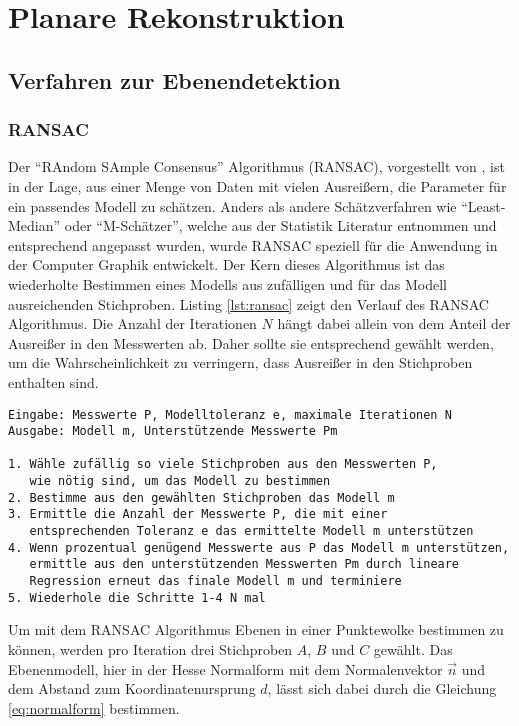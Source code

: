 \section{Planare Rekonstruktion}

\subsection{Verfahren zur Ebenendetektion}

\subsubsection{RANSAC}

Der \enquote{RAndom SAmple Consensus} Algorithmus (RANSAC), vorgestellt von \citet{fischler1981random}, ist in der Lage, aus einer Menge von Daten mit vielen Ausreißern, die Parameter für ein passendes Modell zu schätzen. Anders als andere Schätzverfahren wie \enquote{Least-Median} oder \enquote{M-Schätzer}, welche aus der Statistik Literatur entnommen und entsprechend angepasst wurden, wurde RANSAC speziell für die Anwendung in der Computer Graphik entwickelt. Der Kern dieses Algorithmus ist das wiederholte Bestimmen eines Modells aus zufälligen und für das Modell ausreichenden Stichproben. Listing \ref{lst:ransac} zeigt den Verlauf des RANSAC Algorithmus. Die Anzahl der Iterationen \(N\) hängt dabei allein von dem Anteil der Ausreißer in den Messwerten ab. Daher sollte sie entsprechend gewählt werden, um die Wahrscheinlichkeit zu verringern, dass Ausreißer in den Stichproben enthalten sind. \citep{derpanis2010overview} \\

\begin{lstlisting}[caption=Der RANSAC Algorithmus, label=lst:ransac]
Eingabe: Messwerte P, Modelltoleranz e, maximale Iterationen N
Ausgabe: Modell m, Unterstützende Messwerte Pm

1. Wähle zufällig so viele Stichproben aus den Messwerten P,
   wie nötig sind, um das Modell zu bestimmen
2. Bestimme aus den gewählten Stichproben das Modell m
3. Ermittle die Anzahl der Messwerte P, die mit einer 
   entsprechenden Toleranz e das ermittelte Modell m unterstützen
4. Wenn prozentual genügend Messwerte aus P das Modell m unterstützen,
   ermittle aus den unterstützenden Messwerten Pm durch lineare 
   Regression erneut das finale Modell m und terminiere
5. Wiederhole die Schritte 1-4 N mal
\end{lstlisting} 

Um mit dem RANSAC Algorithmus Ebenen in einer Punktewolke bestimmen zu können, werden pro Iteration drei Stichproben \(A\), \(B\) und \(C\) gewählt. Das Ebenenmodell, hier in der Hesse Normalform mit dem Normalenvektor \(\vec{n}\) und dem Abstand zum Koordinatenursprung \(d\), lässt sich dabei durch die Gleichung \ref{eq:normalform} bestimmen.

